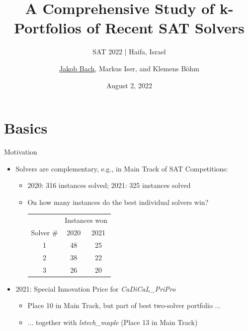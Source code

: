 \documentclass[en]{sdqbeamer}
\title[A Comprehensive Study of k-Portfolios of Recent SAT Solvers]{A Comprehensive Study of k-Portfolios of Recent SAT Solvers} %
\subtitle{SAT 2022 | Haifa, Israel}
\author[\underline{Jakob Bach}, Markus Iser, and Klemens Böhm]{\underline{Jakob Bach}, Markus Iser, and Klemens Böhm} %
\date[2022-08-02]{August 2, 2022} %
\begin{document}
\KITtitleframe

\section{Basics}

\begin{frame}[t]{Motivation}
	\begin{itemize}
		\item Solvers are complementary, e.g., in Main Track of SAT Competitions:
		\begin{itemize}
			\item 2020: 316 instances solved; 2021: 325 instances solved
			\pause
			\item On how many instances do the best individual solvers win? \\
			\vspace{\baselineskip}
			\begin{tabular}{ccc}
				\toprule
				& \multicolumn{2}{c}{Instances won} \\
				\cmidrule{2-3}
				Solver \# & 2020 & 2021 \\
				\midrule
				1 & 48 & 25 \\
				2 & 38 & 22 \\
				3 & 26 & 20 \\
				\bottomrule
			\end{tabular}
		\end{itemize}
		\vspace{\baselineskip}
		\pause
		\item 2021: Special Innovation Price for \emph{CaDiCaL\_PriPro}
		\begin{itemize}
			\item Place 10 in Main Track, but part of best two-solver portfolio ...
			\pause
			\item ... together with \emph{lstech\_maple} (Place 13 in Main Track)
		\end{itemize}
	\end{itemize}
\end{frame}
\end{document}
